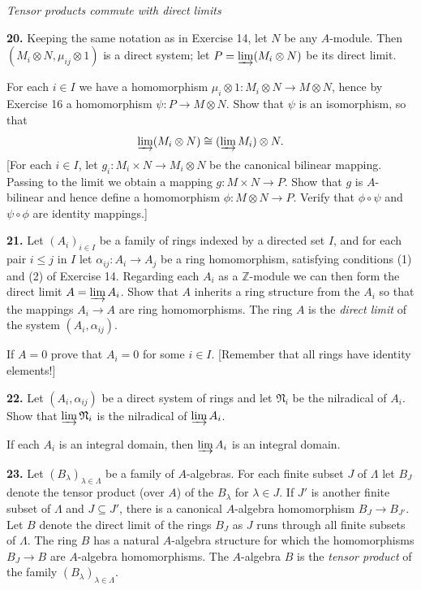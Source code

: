 \medskip
\noindent\emph{Tensor products commute with direct limits}

\medskip
\noindent\amstar\textbf{20.} Keeping the same notation as in Exercise 14, let $N$ be any $A$-module.  Then
$(M_i\otimes N,\mu_{ij}\otimes1)$ is a direct system; let $P=\varinjlim(M_i\otimes N)$ be its direct limit.

For each $i\in I$ we have a homomorphism $\mu_i\otimes1:M_i\otimes N\longrightarrow M\otimes N$, hence by
Exercise 16 a homomorphism $\psi:P\longrightarrow M\otimes N$.  Show that $\psi$ is an isomorphism,
so that
\[
\varinjlim(M_i\otimes N)\cong(\varinjlim M_i)\otimes N.
\]
[For each $i\in I$, let $g_i:M_i\times N\longrightarrow M_i\otimes N$ be the canonical bilinear mapping.
Passing to the limit we obtain a mapping $g:M\times N\longrightarrow P$.  Show that $g$ is
$A$-bilinear and hence define a homomorphism $\phi:M\otimes N\longrightarrow P$.  Verify that
$\phi\circ\psi$ and $\psi\circ\phi$ are identity mappings.]

\medskip
\noindent\amstar\textbf{21.} Let $(A_i)_{i\in I}$ be a family of rings indexed by a directed set $I$, and for each pair $i\leq j$
in $I$ let $\alpha_{ij}:A_i\longrightarrow A_j$ be a ring homomorphism, satisfying conditions (1) and (2)
of Exercise 14.  Regarding each $A_i$ as a $\mathbb Z$-module we can then form the direct
limit $A=\varinjlim A_i$.  Show that $A$ inherits a ring structure from the $A_i$ so that the
mappings $A_i\longrightarrow A$ are ring homomorphisms.  The ring $A$ is the \emph{direct limit} of the
system $(A_i,\alpha_{ij})$.

If $A=0$ prove that $A_i=0$ for some $i\in I$.  [Remember that all rings have
identity elements!]

\medskip
\noindent\textbf{22.} Let $(A_i,\alpha_{ij})$ be a direct system of rings and let $\mathfrak N_i$ be the nilradical of $A_i$.  Show
that $\varinjlim\mathfrak N_i$ is the nilradical of $\varinjlim A_i$.

If each $A_i$ is an integral domain, then $\varinjlim A_i$ is an integral domain.

\medskip
\noindent\textbf{23.} Let $(B_\lambda)_{\lambda\in\Lambda}$ be a family of $A$-algebras.  For each finite subset $J$ of $\Lambda$ let $B_J$ denote
the tensor product (over $A$) of the $B_\lambda$ for $\lambda\in J$.  If $J'$ is another finite subset of $\Lambda$
and $J\subseteq J'$, there is a canonical $A$-algebra homomorphism $B_J\longrightarrow B_{J'}$.  Let $B$
denote the direct limit of the rings $B_J$ as $J$ runs through all finite subsets of $\Lambda$.
The ring $B$ has a natural $A$-algebra structure for which the homomorphisms
$B_J\longrightarrow B$ are $A$-algebra homomorphisms.  The $A$-algebra $B$ is the \emph{tensor product}
of the family $(B_\lambda)_{\lambda\in\Lambda}$.

